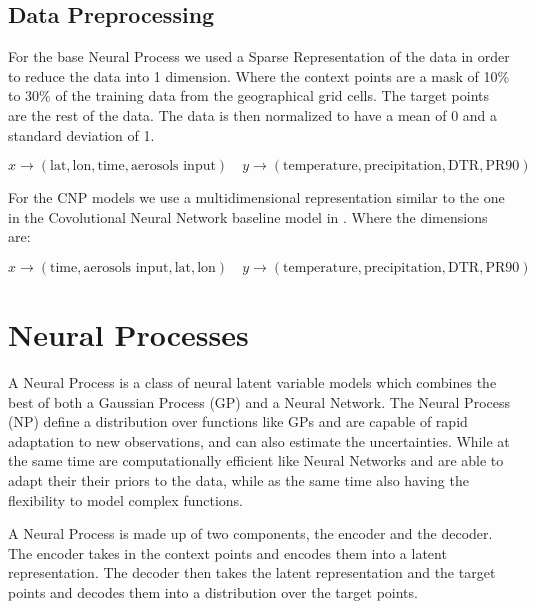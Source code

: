 \documentclass{article} %
\begin{document}
\subsection*{Data Preprocessing}
\label{sec:data_preprocessing}
For the base Neural Process we used a Sparse Representation of the data in order to reduce the data into 1 dimension. Where the context points are a mask of 10\% to 30\% of the training data from the geographical grid cells. The target points are the rest of the data. The data is then normalized to have a mean of 0 and a standard deviation of 1.

\begin{equation*}
    x \rightarrow (\text{lat}, \text{lon}, \text{time}, \text{aerosols input}) \quad y \rightarrow (\text{temperature}, \text{precipitation}, \text{DTR}, \text{PR90})
\end{equation*}

For the CNP models we use a multidimensional representation similar to the one in the Covolutional Neural Network baseline model in \cite{watson2022climatebench}. Where the dimensions are:

\begin{equation*}
    x \rightarrow (\text{time}, \text{aerosols input}, \text{lat}, \text{lon}) \quad y \rightarrow (\text{temperature}, \text{precipitation}, \text{DTR}, \text{PR90})
\end{equation*}

\section*{Neural Processes}
A Neural Process is a class of neural latent variable models which combines the best of both a Gaussian Process (GP) \cite*{rasmussen2006gaussian} and a Neural Network. The Neural Process (NP) \cite{garnelo2018neural} define a distribution over functions like GPs and are capable of rapid adaptation to new observations, and can also estimate the uncertainties. While at the same time are computationally efficient like Neural Networks and are able to adapt their their priors to the data, while as the same time also having the flexibility to model complex functions. 

A Neural Process is made up of two components, the encoder and the decoder. The encoder takes in the context points and encodes them into a latent representation. The decoder then takes the latent representation and the target points and decodes them into a distribution over the target points.
\end{document}
